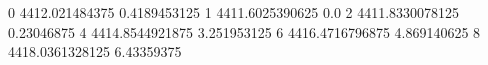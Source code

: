 0 4412.021484375 0.4189453125
1 4411.6025390625 0.0
2 4411.8330078125 0.23046875
4 4414.8544921875 3.251953125
6 4416.4716796875 4.869140625
8 4418.0361328125 6.43359375
